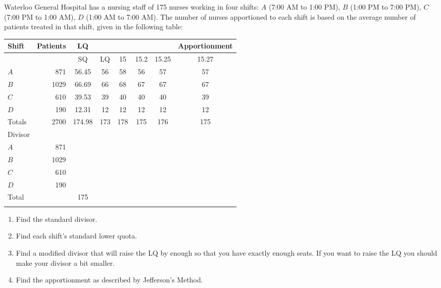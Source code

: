 \clearpage
%
\HOMEWORK
\begin{Denumerate}

	\item Waterloo General Hospital has a nursing staff of 175 nurses working in four shifts: $A$ (7:00 AM to 1:00 PM), $B$ (1:00 PM to 7:00 PM), $C$ (7:00 PM to 1:00 AM), $D$ (1:00 AM to 7:00 AM).  The number of nurses apportioned to each shift is based on the average number of patients treated in that shift, given in the following table:

	\begin{center}
	\large
		\begin{tabular}{lr|c|c|c|c|c|c}
	\hline
Shift		&	Patients &	LQ& \hspace{.75cm} 	& \hspace{.75cm}	& \hspace{.75cm} 	&\hspace{.75cm} 	&  	 	Apportionment \\\hline \ifsolns
  &  & SQ & LQ & 15 & 15.2  & 15.25 & 15.27\\\hline
 $A$  & 871 & 56.45 & 56 & 58 &  56 & 57 & 57\\\hline
 $B$  & 1029 & 66.69 & 66 & 68 &  67 & 67 & 67\\\hline
 $C$  & 610 & 39.53 & 39 & 40 & 40  & 40 & 39\\\hline
 $D$  & 190 & 12.31 & 12 & 12 & 12  & 12 & 12\\\hline\hline
Totals  & 2700 & 174.98 & 173 & 178 & 175 & 176 & 175\\\hline
\else
Divisor	&&&&&&&\\\hline

	 $A$ &	871 &&&&&&\\\hline
	 $B$ &	1029&&&&&&\\\hline
	 $C$&	610&&&&&&\\\hline
	$D$ &	190&&&&&&\\\hline
	Total & & 175 &&&&&\\\hline\fi
	\end{tabular}
	\normalsize
	\end{center}	
	
	\begin{enumerate}
		\item Find the standard divisor.
		\item Find each shift's standard lower quota.
		\item Find a modified divisor that will raise the LQ by enough so that you have exactly enough seats.  If you want to raise the LQ you should make your divisor a bit smaller.
		\item Find the apportionment as described by Jefferson's Method.
	\end{enumerate} \vfill


\end{Denumerate}
